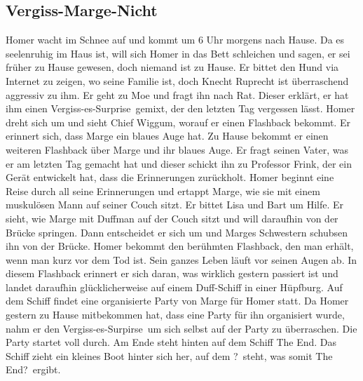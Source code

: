 \subsection{Vergiss-Marge-Nicht}\label{KABF02}
Homer wacht im Schnee auf und kommt um 6 Uhr morgens nach Hause. Da es seelenruhig im Haus ist, will sich Homer in das Bett schleichen und sagen, er sei früher zu Hause gewesen, doch niemand ist zu Hause. Er bittet den Hund via Internet zu zeigen, wo seine Familie ist, doch Knecht Ruprecht ist überraschend aggressiv zu ihm. Er geht zu Moe und fragt ihn nach Rat. Dieser erklärt, er hat ihm einen \glqq Vergiss-es-Surprise\grqq\ gemixt, der den letzten Tag vergessen lässt. Homer dreht sich um und sieht Chief Wiggum, worauf er einen Flashback bekommt. Er erinnert sich, dass Marge ein blaues Auge hat. Zu Hause bekommt er einen weiteren Flashback über Marge und ihr blaues Auge. Er fragt seinen Vater, was er am letzten Tag gemacht hat und dieser schickt ihn zu Professor Frink, der ein Gerät entwickelt hat, dass die Erinnerungen zurückholt. Homer beginnt eine Reise durch all seine Erinnerungen und ertappt Marge, wie sie mit einem muskulösen Mann auf seiner Couch sitzt. Er bittet Lisa und Bart um Hilfe. Er sieht, wie Marge mit Duffman auf der Couch sitzt und will daraufhin von der Brücke springen. Dann entscheidet er sich um und Marges Schwestern schubsen ihn von der Brücke. Homer bekommt den berühmten Flashback, den man erhält, wenn man kurz vor dem Tod ist. Sein ganzes Leben läuft vor seinen Augen ab. In diesem Flashback erinnert er sich daran, was wirklich gestern passiert ist und landet daraufhin glücklicherweise auf einem Duff-Schiff in einer Hüpfburg. Auf dem Schiff findet eine organisierte Party von Marge für Homer statt. Da Homer gestern zu Hause mitbekommen hat, dass eine Party für ihn organisiert wurde, nahm er den \glqq Vergiss-es-Surpirse\grqq\ um sich selbst auf der Party zu überraschen. Die Party startet voll durch. Am Ende steht hinten auf dem Schiff \glqq The End\grqq . Das Schiff zieht ein kleines Boot hinter sich her, auf dem \glqq ?\grqq\ steht, was somit \glqq The End?\grqq\ ergibt. 



